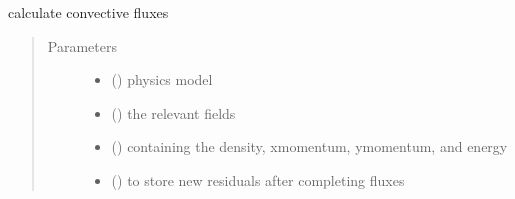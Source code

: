 \documentclass[letterpaper,10pt,english]{sphinxmanual}
\begin{document}
\begin{fulllineitems}
\label{\detokenize{autoapi/eflux/index:eflux.eflux}}
\sphinxAtStartPar
calculate convective fluxes
\begin{quote}\begin{description}
\item[{Parameters}] \leavevmode\begin{itemize}
\item {} 
\sphinxAtStartPar
{} ({\hyperref[\detokenize{autoapi/NavierStokes/index:NavierStokes.NavierStokes}]{}}) \textendash{} physics model

\item {} 
\sphinxAtStartPar
{} ({\hyperref[\detokenize{autoapi/Workspace/index:Workspace.Workspace}]{}}) \textendash{} the relevant fields

\item {} 
\sphinxAtStartPar
{} ({\hyperref[\detokenize{autoapi/Field/index:Field.Field}]{}}) \textendash{} containing the density, x\sphinxhyphen{}momentum, y\sphinxhyphen{}momentum, and energy

\item {} 
\sphinxAtStartPar
{} ({\hyperref[\detokenize{autoapi/Field/index:Field.Field}]{}}) \textendash{} to store new residuals after completing fluxes

\end{itemize}

\end{description}\end{quote}

\end{fulllineitems}



\section{}
\label{\detokenize{autoapi/halo/index:module-halo}}\label{\detokenize{autoapi/halo/index:halo}}\label{\detokenize{autoapi/halo/index::doc}}
\end{document}
